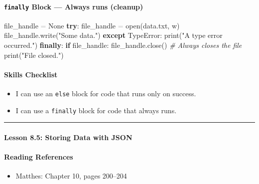 \documentclass[
  justified,
  openright,
]{tufte-book}
\let\subsection\paragraph
\let\paragraph\paragraph
\newcommand{\KeywordTok}[1]{\textcolor{CodeKeyword}{\textbf{#1}}}  %
\newcommand{\StringTok}[1]{\textcolor{CodeString}{#1}}              %
\newcommand{\CommentTok}[1]{\textcolor{CodeComment}{\textit{#1}}}  %
\newcommand{\CodeAccentTok}[1]{\textcolor{CodeAccent}{#1}}          %
\newcommand{\OperatorTok}[1]{\textcolor{DarkGray}{#1}}              %
\newenvironment{Shaded}{%
  \begin{mdframed}[style=TufteCode]%
}{%
  \end{mdframed}%
}
\let\subsection\paragraph
\let\paragraph\paragraph
\providecommand{\tightlist}{%
  \setlength{\itemsep}{0pt}\setlength{\parskip}{0pt}}
\begin{document}
\subsection{\texorpdfstring{\texttt{finally} Block --- Always runs
(cleanup)}{finally Block --- Always runs (cleanup)}}\label{finally-block-always-runs-cleanup}

\begin{Shaded}
\begin{Highlighting}[]
file\_handle \OperatorTok{=} None
\KeywordTok{try}:
    file\_handle \OperatorTok{=} open(\StringTok{\textquotesingle{}data.txt\textquotesingle{}}, \StringTok{\textquotesingle{}w\textquotesingle{}})
    file\_handle.write(\StringTok{"Some data."})
\KeywordTok{except} \CodeAccentTok{TypeError}:
    print(\StringTok{"A type error occurred."})
\KeywordTok{finally}:
    \KeywordTok{if} file\_handle:
        file\_handle.close()     \CommentTok{\# Always closes the file}
        print(\StringTok{"File closed."})
\end{Highlighting}
\end{Shaded}

\subsection{Skills Checklist}\label{skills-checklist-40}

\begin{itemize}
\tightlist
\item[$\square$]
  I can use an \texttt{else} block for code that runs only on success.
\item[$\square$]
  I can use a \texttt{finally} block for code that always runs.
\end{itemize}

\begin{center}\rule{0.5\linewidth}{0.5pt}\end{center}

\subsection{Lesson 8.5: Storing Data with
JSON}\label{lesson-8.5-storing-data-with-json}

\subsection{Reading References}\label{reading-references-26}

\begin{itemize}
\tightlist
\item
  Matthes: Chapter 10, pages 200--204
\end{itemize}
\end{document}
